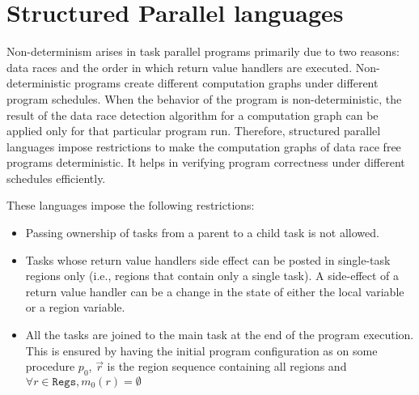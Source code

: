 \section{Structured Parallel languages}
\label{sec:otf-drd}

Non-determinism arises in task parallel programs primarily due to two reasons: data races and the order in which return value handlers are executed. Non-deterministic programs create different computation graphs under different program schedules. When the behavior of the program is non-deterministic, the result of the data race detection algorithm for a computation graph can be applied only for that particular program run. 
Therefore, structured parallel languages impose restrictions to make the computation graphs of data race free programs deterministic. It helps in verifying program correctness under different schedules efficiently. 

These languages impose the following restrictions:
\begin{itemize}
\item Passing ownership of tasks from a parent to a child task is not allowed. 
\item Tasks whose return value handlers side effect can be posted in single-task regions only (i.e., regions that contain only a single task). A side-effect of a return value handler can be a change in the state of either the local variable or a region variable. 
\item All the tasks are joined to the main task at the end of the program execution. This is ensured by having the initial program configuration as  on some procedure $p_0$, $\vec{r}$ is the region sequence containing all regions and $\forall r \in \mathtt{Regs}, m_0(r) = \emptyset$
\end{itemize}

\begin{comment}
The non-determinism in program behavior due to different order of execution of return value handlers is countered by structured parallel languages such as Habanero Java and X10 by imposing an order on the task synchronization when the return value handlers do not commute. The languages do not allow task passing to ensure that task synchronization is always predefined and does not depend on the program schedule. All the un-synchronized tasks have to join to the main task at the end of program execution to ensure determinism in structure of computation graphs under different schedules.
\end{comment}

